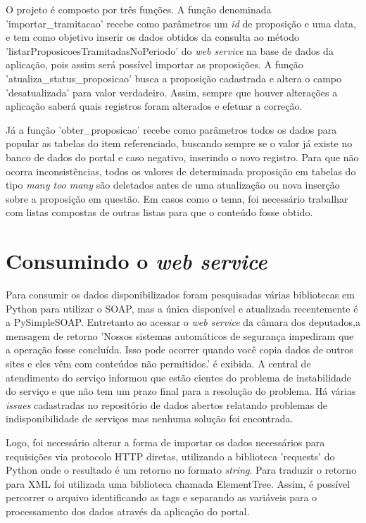 \documentclass[
	12pt,				%
	openright,			%
	twoside,			%
	a4paper,			%
	english,			%
	french,				%
	spanish,			%
	brazil				%
	]{abntex2}
\begin{document}
O projeto é composto por três funções. A função denominada 'importar\_tramitacao' recebe como parâmetros um \emph{id} 
de proposição e uma data, e tem como objetivo inserir os dados obtidos da consulta ao método 'listarProposicoesTramitadasNoPeriodo'
do \emph{web service} na base de dados da aplicação, pois assim será possível importar as proposições. A função 'atualiza\_status\_proposicao' 
busca a proposição cadastrada e altera o campo 'desatualizada' para valor verdadeiro. Assim, sempre
que houver alterações a aplicação saberá quais registros foram alterados e efetuar a correção.

Já a função 'obter\_proposicao' recebe como parâmetros todos os dados para popular as tabelas do item referenciado, buscando sempre
se o valor já existe no banco de dados do portal e caso negativo, inserindo o novo registro. Para que não ocorra inconsistências, 
todos os valores de determinada proposição em tabelas do tipo \emph{many too many} são deletados antes de uma atualização ou nova 
inserção sobre a proposição em questão. Em casos como o tema, foi necessário trabalhar com listas compostas de outras listas para que 
o conteúdo fosse obtido.

\section{Consumindo o \emph{web service}}
Para consumir os dados disponibilizados foram pesquisadas várias bibliotecas em Python para utilizar o SOAP, mas a única disponível
e atualizada recentemente é a PySimpleSOAP. Entretanto ao acessar o \emph{web service} da câmara dos deputados,a mensagem de retorno 'Nossos sistemas automáticos de segurança impediram que a operação fosse concluída.
Isso pode ocorrer quando você copia dados de outros sites e eles vêm com conteúdos não permitidos.' é exibida. A central de atendimento do serviço informou que estão
cientes do problema de instabilidade do serviço e que não tem um prazo final para a resolução do problema. Há várias \emph{issues} cadastradas 
no repositório de dados abertos relatando problemas de indisponibilidade de serviços mas nenhuma solução foi encontrada.

Logo, foi necessário alterar a forma de importar os dados necessários para requisições via protocolo HTTP diretas, utilizando a biblioteca 'requests' do Python onde o resultado é um retorno no formato \emph{string}. Para traduzir
o retorno para XML foi utilizada uma biblioteca chamada ElementTree. Assim, é possível percorrer o arquivo identificando as tags e 
separando as variáveis para o processamento dos dados através da aplicação do portal.
\end{document}
